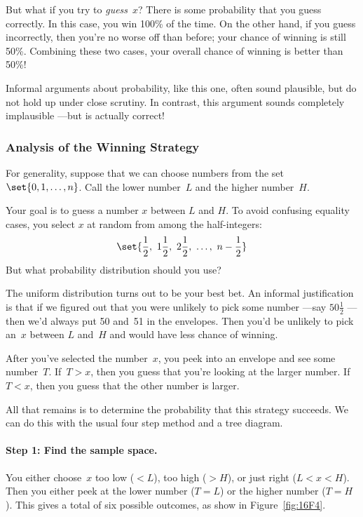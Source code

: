 But what if you try to \emph{guess}~$x$?  There is some probability
that you guess correctly.  In this case, you win 100\% of the time.
On the other hand, if you guess incorrectly, then you're no worse off
than before; your chance of winning is still 50\%.  Combining these
two cases, your overall chance of winning is better than 50\%!

Informal arguments about probability, like this one, often sound
plausible, but do not hold up under close scrutiny.  In contrast, this
argument sounds completely implausible ---but is actually correct!

\subsubsection{Analysis of the Winning Strategy}

For generality, suppose that we can choose numbers from the set
$\set{0, 1, \dots, n}$.  Call the lower number~$L$ and the higher
number~$H$.

Your goal is to guess a number $x$ between $L$ and $H$.  To avoid
confusing equality cases, you select $x$ at random from among the
half-integers:
%
\[
\set{\frac{1}{2},\ 1\frac{1}{2},\ 2\frac{1}{2},\ \dots,\ n - \frac{1}{2}}
\]
%
But what probability distribution should you use?

The uniform distribution turns out to be your best bet.  An informal
justification is that if we figured out that you were unlikely to pick
some number ---say $50\frac{1}{2}$ ---then we'd always put 50 and~51
in the envelopes.  Then you'd be unlikely to pick an~$x$ between $L$
and~$H$ and would have less chance of winning.

After you've selected the number~$x$, you peek into an envelope and
see some number~$T$.  If~$T > x$, then you guess that you're looking
at the larger number.  If~$T < x$, then you guess that the other
number is larger.

All that remains is to determine the probability that this strategy
succeeds.  We can do this with the usual four step method and a tree
diagram.

\paragraph{Step 1: Find the sample space.}

You either choose~$x$ too low ($< L$), too high ($> H$), or just right
($L < x < H$).  Then you either peek at the lower number ($T = L$) or
the higher number ($T = H$).  This gives a total of six possible
outcomes, as show in Figure~\ref{fig:16F4}.

